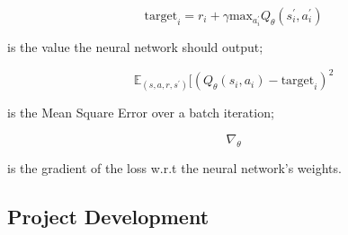 \documentclass[14pt]{extarticle}
\def\sp{\vspace{5pt}}
\begin{document}
\begin{flushleft}
\[\text{target}_i = r_i + \gamma\text{max}_{a_i^\prime}Q_{\theta}(s_i^{\prime},a_i^{\prime})\]
\vspace{-13mm}
\begin{center}
is the value the neural network should output;
\end{center}

\[\mathbb{E}_{(s,a,r,s^\prime)}[(Q_{\theta}(s_i,a_i) - \text{target}_i)^2\] 
\vspace{-12mm}
\begin{center}
is the Mean Square Error over a batch iteration;
\end{center}



\[\nabla_{\theta}\]
\vspace{-13mm}
\begin{center}
is the gradient of the loss w.r.t the neural network's weights.
\end{center}

\end{flushleft}


\newpage
\begin{center}
	\section{Project Development}
	\sp
\end{center}
\begin{flushleft}

\end{flushleft}
\end{document}
